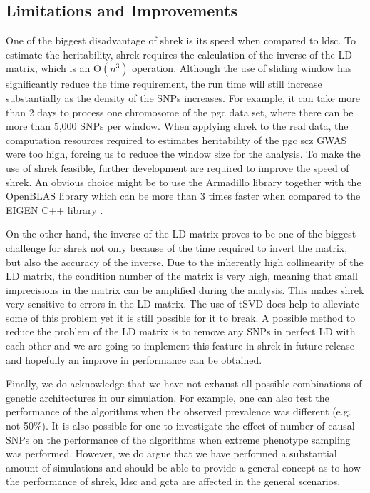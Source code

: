 \documentclass[12pt]{scrbook}
\newcommand*{\glng}{\glsentrylong}
\begin{document}
\subsection{Limitations and Improvements}
One of the biggest disadvantage of \gls{shrek} is its speed when compared to \gls{ldsc}. 
To estimate the heritability, \gls{shrek} requires the calculation of the inverse of the \gls{LD} matrix, which is an $\mathrm{O}(n^3)$ operation. 
Although the use of sliding window has significantly reduce the time requirement, the run time will still increase substantially as the density of the \glspl{SNP} increases. 
For example, it can take more than 2 days to process one chromosome of the \gls{pgc} \glng{scz} data set, where there can be more than 5,000 \glspl{SNP} per window.
When applying \gls{shrek} to the real data, the computation resources required to estimates heritability of the \gls{pgc} \gls{scz} \gls{GWAS} were too high, forcing us to reduce the window size for the analysis. 
To make the use of \gls{shrek} feasible, further development are required to improve the speed of \gls{shrek}.
An obvious choice might be to use the Armadillo library \citep{Sanderson2010} together with the OpenBLAS library which can be more than 3 times faster when compared to the EIGEN C++ library \citep{Ho2011}.

On the other hand, the inverse of the \gls{LD} matrix proves to be one of the biggest challenge for \gls{shrek} not only because of the time required to invert the matrix, but also the accuracy of the inverse.
Due to the inherently high collinearity of the \gls{LD} matrix, the condition number of the matrix is very high, meaning that small imprecisions in the matrix can be amplified during the analysis. 
This makes \gls{shrek} very sensitive to errors in the \gls{LD} matrix. 
The use of \gls{tSVD} does help to alleviate some of this problem yet it is still possible for it to break.
A possible method to reduce the problem of the \gls{LD} matrix is to remove any \glspl{SNP} in perfect \gls{LD} with each other and we are going to implement this feature in \gls{shrek} in future release and hopefully an improve in performance can be obtained.  

Finally, we do acknowledge that we have not exhaust all possible combinations of genetic architectures in our simulation.
For example, one can also test the performance of the algorithms when the observed prevalence was different (e.g. not 50\%).
It is also possible for one to investigate the effect of number of causal \glspl{SNP} on the performance of the algorithms when extreme phenotype sampling was performed.
However, we do argue that we have performed a substantial amount of simulations and should be able to provide a general concept as to how the performance of \gls{shrek}, \gls{ldsc} and \gls{gcta} are affected in the general scenarios.
\end{document}

